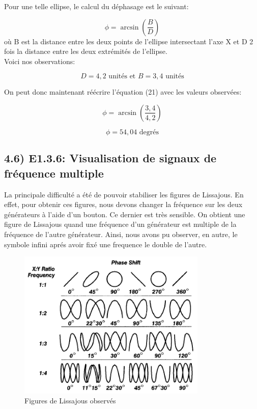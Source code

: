 \documentclass{report}
\begin{document}
Pour une telle ellipse, le calcul du d\'ephasage est le suivant:

\begin{equation}
     \phi = \arcsin(\frac{B}{D})
\end{equation}
o\`u B est la distance entre les deux points de l'ellipse intersectant l'axe X et D 2 fois la distance entre les deux extr\'emit\'es de l'ellipse.
\\
Voici nos observations:

\begin{equation}
    D = 4,2 \text{ unit\'es et } B = 3,4 \text{ unit\'es}     
\end{equation}

On peut donc maintenant r\'e\'ecrire l'\'equation (21) avec les valeurs observ\'ees:

\begin{equation}
    \phi = \arcsin(\frac{3,4}{4,2})    
\end{equation}

\begin{equation}
    \phi = 54,04 \text{ degr\'es}   
\end{equation}

\subsection*{4.6) E1.3.6: Visualisation de signaux de fr\'equence multiple}
\hspace*{0.5cm}
La principale difficult\'e a \'et\'e de pouvoir stabiliser les figures de Lissajous. En effet, pour obtenir ces figures, nous devons changer la fr\'equence sur les deux g\'en\'erateurs \`a l'aide d'un bouton. Ce dernier est tr\`es sensible. On obtient une figure de Lissajous quand une fr\'equence d'un g\'en\'erateur est multiple de la fr\'equence de l'autre g\'en\'erateur. Ainsi, nous avons pu observer, en autre, le symbole infini apr\'es avoir fix\'e une frequence le double de l'autre.
\hspace*{0.5cm}
\begin{figure}[ht!]
\centering
\includegraphics[width=90mm]{circuitE1.3.6.png}
\caption{Figures de Lissajous observ\'es}
\label{overflow}
\end{figure}
\\
\end{document}
